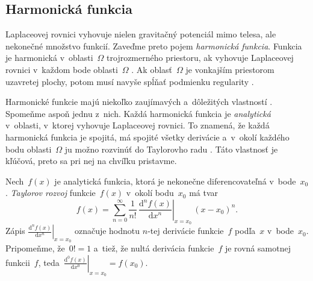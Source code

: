 \documentclass[a4paper, 12pt]{book}
\newcommand{\diff}{\mathrm d}
\begin{document}
\subsection{Harmonická funkcia}
\label{sec:harmonic_function}

Laplaceovej rovnici vyhovuje nielen gravitačný potenciál mimo telesa, ale
nekonečné množstvo funkcií.  Zaveďme preto pojem \emph{harmonická funkcia}.
Funkcia je harmonická v~oblasti~$\Omega$ trojrozmerného priestoru, ak vyhovuje 
Laplaceovej rovnici v~každom bode oblasti~$\Omega$ 
\parencite{MoritzPhysicalGeodesy}.  Ak oblasť~$\Omega$ je vonkajším priestorom 
uzavretej plochy, potom musí navyše spĺňať podmienku regularity 
\parencite[pozri 
nerovnosti~\ref{eq:regular_function};][]{MoritzPhysicalGeodesy}.

Harmonické funkcie majú niekoľko zaujímavých a~dôležitých vlastností 
\parencite[pozri napríklad][]{Kellogg1967,Pick1973,Janak2006}.  Spomeňme aspoň 
jednu z~nich.  Každá harmonická funkcia je \emph{analytická} v~oblasti, 
v~ktorej vyhovuje Laplaceovej rovnici.  To znamená, že každá harmonická funkcia 
je spojitá, má spojité všetky derivácie a~v~okolí každého bodu oblasti~$\Omega$ 
ju možno rozvinúť do Taylorovho radu \parencite{MoritzPhysicalGeodesy}.  Táto 
vlastnosť je kľúčová, preto sa pri nej na chvíľku pristavme.

Nech~$f(x)$ je analytická funkcia, ktorá je nekonečne diferencovateľná 
v~bode~$x_0$.  \emph{Taylorov rozvoj} funkcie~$f(x)$ v~okolí bodu~$x_0$ má tvar
%
\begin{equation}
\label{eq:f_taylor}
f(x) = \sum_{n = 0}^\infty \frac{1}{n!} \, \left.\frac{\diff^n f(x)}{\diff x^n} 
\right|_{x = x_0} \, (x - x_0)^n{.}
\end{equation}
%
Zápis $\left.\frac{\diff^n f(x)}{\diff x^n} \right|_{x = x_0}$ označuje hodnotu 
$n$-tej derivácie funkcie~$f$ podľa~$x$ v~bode~$x_0$.  Pripomeňme, že~$0!  = 1$ 
a~tiež, že nultá derivácia funkcie~$f$ je rovná samotnej funkcii~$f$, 
teda~$\left.\frac{\diff^0 f(x)}{\diff x^0}\right|_{x = x_0} = f(x_0)$.
\end{document}
